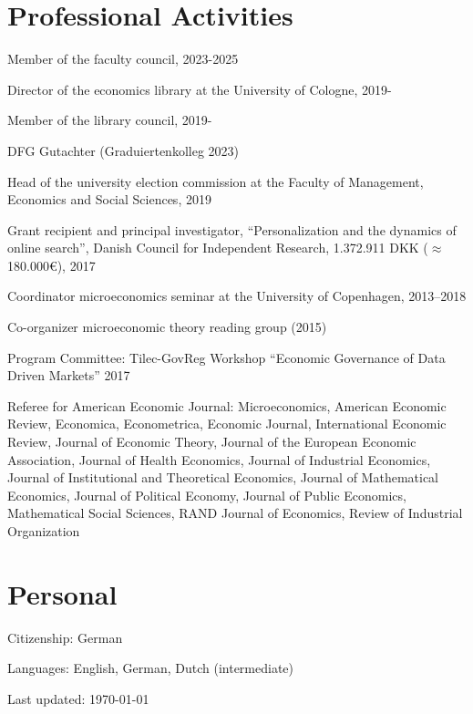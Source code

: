 \documentclass[a4paper]{article}
\def\footerlink{}
\renewenvironment{itemize}{
  \begin{list}{}{
    \setlength{\leftmargin}{1.5em}
  }
}{
  \end{list}
}
\begin{document}
\section*{Professional Activities}
\begin{itemize}
\item Member of the faculty council, 2023-2025  
\item Director of the economics library at the University of Cologne, 2019-
\item Member of the library council, 2019-
\item DFG Gutachter (Graduiertenkolleg 2023)
  \item Head of the university election commission at the Faculty of Management, Economics and Social Sciences, 2019
\item Grant recipient and principal investigator, ``Personalization and the dynamics of online search'', Danish Council for Independent Research, 1.372.911 DKK ($\approx$180.000\euro), 2017
\item Coordinator microeconomics seminar at the University of Copenhagen, 2013--2018
\item Co-organizer microeconomic theory reading group (2015)
  \item Program Committee: Tilec-GovReg Workshop ``Economic Governance of Data Driven Markets'' 2017
\item Referee for American Economic Journal: Microeconomics, American Economic Review, Economica, Econometrica, Economic Journal, International Economic Review, Journal of Economic Theory, Journal of the European Economic Association, Journal of Health Economics, Journal of Industrial Economics, Journal of Institutional and Theoretical Economics, Journal of Mathematical Economics, Journal of Political Economy, Journal of Public Economics, Mathematical Social Sciences, RAND Journal of Economics, Review of Industrial Organization
\end{itemize}


\section*{Personal}

\begin{itemize}
\item Citizenship: German
\item Languages: English, German, Dutch (intermediate)
\end{itemize}


\null\vfill %
\begin{center}
  \begin{footnotesize}
    Last updated: \today \\
    \href{\footerlink}{\texttt{\footerlink}}
  \end{footnotesize}
\end{center}
\end{document}
